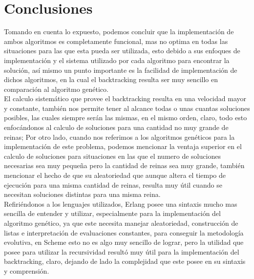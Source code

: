 \documentclass[12pt,a4paper]{article}
\begin{document}
\section{Conclusiones}
Tomando en cuenta lo expuesto, podemos concluir que la implementación de ambos algoritmos es completamente funcional, mas no optima en todas las situaciones para las que esta pueda ser utilizada, esto debido a sus enfoques de implementación y el sistema utilizado por cada algoritmo para encontrar la solución, así mismo un punto importante es la facilidad de implementación de dichos algoritmos, en la cual el backtracking resulta ser muy sencillo en comparación al algoritmo genético. \\

El calculo sistemático que provee el backtracking resulta en una velocidad mayor y constante, también nos permite tener al alcance todas o unas cuantas  soluciones posibles, las cuales siempre serán las mismas, en el mismo orden, claro, todo esto enfocándonos al calculo de soluciones para una cantidad no muy grande de reinas; Por otro lado, cuando nos referimos a los algoritmos genéticos para la implementación de este problema, podemos mencionar la ventaja superior en el calculo de soluciones para situaciones en las que el numero de soluciones necesarias sea muy pequeña pero la cantidad de reinas sea muy grande, también mencionar el hecho de que su aleatoriedad que aunque altera el tiempo de ejecución para una misma cantidad de reinas,  resulta muy útil cuando se necesitan soluciones distintas para una misma reina.
\\

Refiriéndonos a los lenguajes utilizados, Erlang posee una sintaxis mucho mas sencilla de entender y utilizar, especialmente para la implementación del algoritmo genético, ya que este necesita manejar aleatoriedad, construcción de listas e interpretación de evaluaciones constantes, para conseguir la metodología evolutiva, en Scheme esto no es algo muy sencillo de lograr, pero la utilidad que posee para utilizar la recursividad resultó muy útil para la implementación del backtracking, claro, dejando de lado la complejidad que este posee en su sintaxis y comprensión.
\\
\newpage
\end{document}

